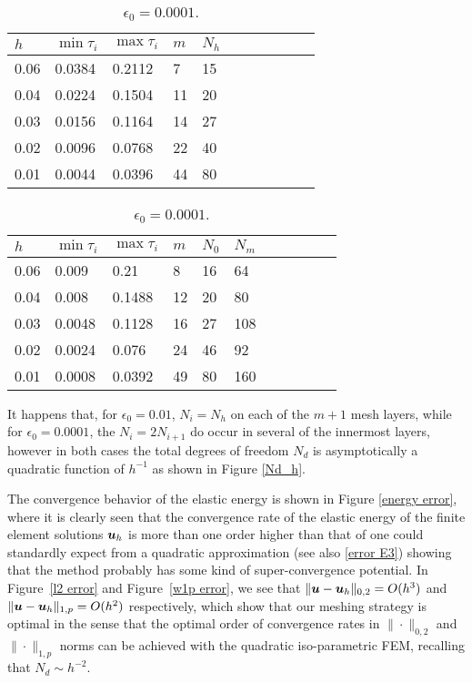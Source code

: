 \documentclass[12pt]{article}
\renewcommand{\vec}[1]{\mbox{\boldmath$#1$}}
\numberwithin{equation}{section}
\begin{document}
\begin{table}[ht!]
\small
\begin{minipage}[l]{0.475\textwidth}
\caption{$\epsilon_0=0.01$.}\label{e-2}
\vspace*{1mm}\hspace*{1mm}
  \begin{tabular}{|l|l|l|l|l|l|l|l|l|l|l|}
\hline
$h$&$\min \tau_i$&$\max \tau_i$&$m$& $N_h$\\\hline
0.06&0.0384&0.2112&7&15\\\hline
0.04&0.0224&0.1504&11&20\\\hline
0.03 &0.0156&0.1164&14&27\\\hline
0.02&0.0096&0.0768&22&40\\\hline
0.01&0.0044&0.0396&44&80\\\hline
\end{tabular}
\end{minipage}\hspace*{5mm}
	\begin{minipage}[l]{0.525\textwidth}
\caption{$\epsilon_0=0.0001$.}\label{e-4}
\vspace*{1mm}
\begin{tabular}{|l|l|l|l|l|l|l|l|l|l|l|}
\hline
$h$&$\min \tau_i$&$\max \tau_i$&$m$&$N_0$&$N_m$\\\hline
0.06&0.009&0.21&8&16&64 \\\hline
0.04&0.008&0.1488&12&20&80\\\hline
0.03&0.0048&0.1128&16 &27&108 \\\hline
0.02&0.0024&0.076&24&46& 92 \\\hline
0.01&0.0008&0.0392&49&80 &160\\\hline
\end{tabular}
\end{minipage}
\end{table}

It happens that, for $\epsilon_0=0.01$, $N_i=N_h$ on each of the $m+1$ mesh layers,
while for $\epsilon_0=0.0001$, the $N_i=2N_{i+1}$ do occur in several of the innermost layers,
however in both cases the total degrees of freedom $N_d$ is asymptotically a quadratic
function of $h^{-1}$ as shown in Figure \ref{Nd_h}.

The convergence behavior of the elastic energy is shown in Figure
\ref{energy error}, where it is clearly seen that the convergence rate of the elastic
energy of the finite element solutions $\vec{u}_h$ is more than one order higher than that
of one could standardly expect from a quadratic approximation (see also \eqref{error E3})
showing that the method probably has some kind of super-convergence potential.
In Figure~\ref{l2 error} and Figure~\ref{w1p error}, we see that
$\|\vec{u}-\vec{u}_h\|_{0,2}=O(h^3)$ and $\|\vec{u}-\vec{u}_h\|_{1,p}=O(h^2)$
respectively, which show that our meshing strategy is optimal in the sense that
the optimal order of convergence rates in $\|\cdot\|_{0,2}$ and $\|\cdot \|_{1,p}$ norms
can be achieved with the quadratic iso-parametric FEM, recalling that $N_d \sim h^{-2}$.
\end{document}
